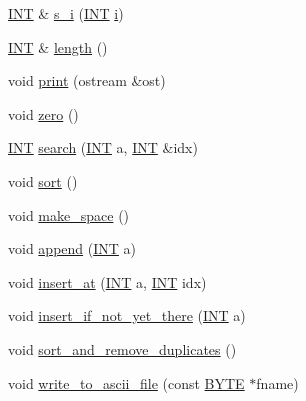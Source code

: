 \begin{DoxyCompactItemize}
\mbox{\hyperlink{galois_8h_a09fddde158a3a20bd2dcadb609de11dc}{I\+NT}} \& \mbox{\hyperlink{class_i_n_t__vector_a97e5452cb533c83516230a89c3638e14}{s\+\_\+i}} (\mbox{\hyperlink{galois_8h_a09fddde158a3a20bd2dcadb609de11dc}{I\+NT}} \mbox{\hyperlink{alphabet2_8_c_acb559820d9ca11295b4500f179ef6392}{i}})
\item 
\mbox{\hyperlink{galois_8h_a09fddde158a3a20bd2dcadb609de11dc}{I\+NT}} \& \mbox{\hyperlink{class_i_n_t__vector_a6660cbf7632182898f5b4d41a570a320}{length}} ()
\item 
void \mbox{\hyperlink{class_i_n_t__vector_ad96578c185d718b117f3be6d06f6069e}{print}} (ostream \&ost)
\item 
void \mbox{\hyperlink{class_i_n_t__vector_a76a486fd25deb837d629bc3d46bcba78}{zero}} ()
\item 
\mbox{\hyperlink{galois_8h_a09fddde158a3a20bd2dcadb609de11dc}{I\+NT}} \mbox{\hyperlink{class_i_n_t__vector_a2caea4060d9f832ea506032fc97551c0}{search}} (\mbox{\hyperlink{galois_8h_a09fddde158a3a20bd2dcadb609de11dc}{I\+NT}} a, \mbox{\hyperlink{galois_8h_a09fddde158a3a20bd2dcadb609de11dc}{I\+NT}} \&idx)
\item 
void \mbox{\hyperlink{class_i_n_t__vector_ac21cca6e1fb81592266219514e91926f}{sort}} ()
\item 
void \mbox{\hyperlink{class_i_n_t__vector_a24a3c48dd10887b43d1607feb9c873ca}{make\+\_\+space}} ()
\item 
void \mbox{\hyperlink{class_i_n_t__vector_a311ab8fe69182ea53755c5d879e67009}{append}} (\mbox{\hyperlink{galois_8h_a09fddde158a3a20bd2dcadb609de11dc}{I\+NT}} a)
\item 
void \mbox{\hyperlink{class_i_n_t__vector_adc2f7f6fb36a57cc2640ccb5b0dca204}{insert\+\_\+at}} (\mbox{\hyperlink{galois_8h_a09fddde158a3a20bd2dcadb609de11dc}{I\+NT}} a, \mbox{\hyperlink{galois_8h_a09fddde158a3a20bd2dcadb609de11dc}{I\+NT}} idx)
\item 
void \mbox{\hyperlink{class_i_n_t__vector_a8f86d5b850f4e873dcc025304a315075}{insert\+\_\+if\+\_\+not\+\_\+yet\+\_\+there}} (\mbox{\hyperlink{galois_8h_a09fddde158a3a20bd2dcadb609de11dc}{I\+NT}} a)
\item 
void \mbox{\hyperlink{class_i_n_t__vector_ae6e07b76c79073c2044c944b4b39fdc3}{sort\+\_\+and\+\_\+remove\+\_\+duplicates}} ()
\item 
void \mbox{\hyperlink{class_i_n_t__vector_a07a672394c302afe434591525613516b}{write\+\_\+to\+\_\+ascii\+\_\+file}} (const \mbox{\hyperlink{galois_8h_ab6cc7b4aeb6ea31aba2b3fbfc83ff5e6}{B\+Y\+TE}} $\ast$fname)
\item 

\end{DoxyCompactItemize}
